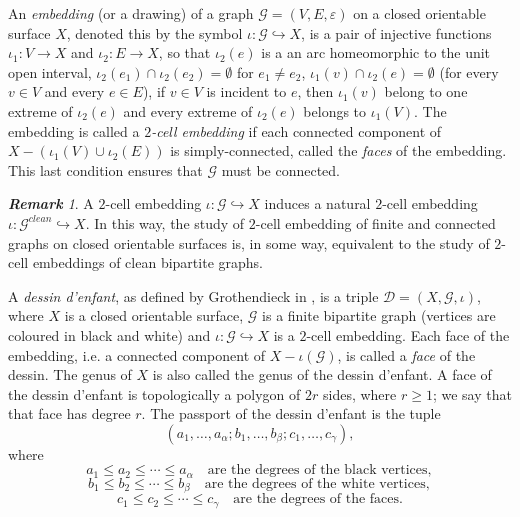 \documentclass[12pt]{amsart}
\theoremstyle{remark}
\newtheorem{rema}{\bf Remark}
\begin{document}
An {\it embedding} (or a drawing) of a graph ${\mathcal G}=(V,E,\varepsilon)$ on a closed orientable surface $X$, denoted this by the symbol $\iota:{\mathcal G} \hookrightarrow X$, is a pair of injective functions
$\iota_{1}:V \to X$ and $\iota_{2}:E \to X$, so that $\iota_{2}(e)$ is a an arc homeomorphic to the unit open interval, $\iota_{2}(e_{1}) \cap \iota_{2}(e_{2})=\emptyset$ for $e_{1} \neq e_{2}$, $\iota_{1}(v) \cap \iota_{2}(e)=\emptyset$ (for every $v \in V$ and every $e \in E$), if $v \in V$ is incident to $e$, then $\iota_{1}(v)$ belong to one extreme of $\iota_{2}(e)$ and every extreme of $\iota_{2}(e)$ belongs to $\iota_{1}(V)$. The 
embedding is called a {\it $2$-cell embedding} if each connected component of $X-(\iota_{1}(V) \cup \iota_{2}(E))$ is simply-connected, called the {\it faces} of the embedding. This last condition ensures that ${\mathcal G}$ must be connected.

{\vspace{0.3cm}}
\noindent
\begin{rema}
A $2$-cell embedding $\iota:{\mathcal G} \hookrightarrow X$ induces a natural $2$-cell embedding
$\iota:{\mathcal G}^{clean} \hookrightarrow X$. In this way, the study of $2$-cell embedding of finite and connected graphs on closed orientable surfaces is, in some way, equivalent to the study of $2$-cell embeddings of clean bipartite graphs.
\end{rema}

{\vspace{0.3cm}}

A {\it dessin d'enfant}, as defined by Grothendieck in \cite{Gro}, is a triple ${\mathcal D}=(X,{\mathcal G},\iota)$, where $X$ is a closed orientable surface, ${\mathcal G}$ is a finite bipartite graph (vertices are coloured in black and white) and $\iota:{\mathcal G} \hookrightarrow X$ is a $2$-cell embedding.  Each face of the embedding, i.e. a connected component of $X-\iota({\mathcal G})$, is called a {\it face} of the dessin.   The genus of $X$ is also called the genus of the dessin d'enfant.  A face of the dessin d'enfant is topologically a polygon of $2r$ sides, where $r \geq 1$; we say that that face has degree $r$. The passport of the dessin d'enfant is the tuple
$$(a_{1},\ldots,a_{\alpha};b_{1},\ldots,b_{\beta};c_{1},\ldots,c_{\gamma}),$$
where $$a_{1} \leq a_{2} \leq \cdots \leq a_{\alpha} \quad \mbox{are the degrees of the black vertices},$$
$$b_{1} \leq b_{2} \leq \cdots \leq b_{\beta} \quad \mbox{are the degrees of the white vertices},$$
$$c_{1} \leq c_{2} \leq \cdots \leq c_{\gamma} \quad \mbox{are the degrees of the faces}.$$
\end{document}
